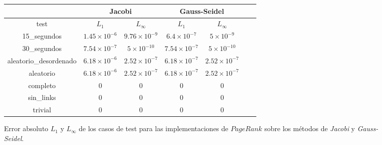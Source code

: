 \vspace{1em}
\begin{figure}[!htbp]
        \begin{tabular}{ |c|c|c|c|c|c|c| } 
        \hline
                                & \multicolumn{2}{c|}{Jacobi}    & \multicolumn{2}{c|}{Gauss-Seidel} \\
        \hline
        test                    & $L_1$             & $L_{\infty}$      & $L_1$     & $L_{\infty}$ \\
        \hline
        15\_segundos            & $1.45 \times 10^{-6}$  & $9.76 \times 10^{-9}$  & $6.4 \times 10^{-7}$  & $5 \times 10^{-9}$ \\
        30\_segundos            & $7.54 \times 10^{-7}$  & $5 \times 10^{-10}$  & $7.54 \times 10^{-7}$  & $5 \times 10^{-10}$ \\
        aleatorio\_desordenado   & $6.18 \times 10^{-6}$  & $2.52 \times 10^{-7}$  & $6.18 \times 10^{-7}$  & $2.52 \times 10^{-7}$ \\
        aleatorio               & $6.18 \times 10^{-6}$  & $2.52 \times 10^{-7}$  & $6.18 \times 10^{-7}$  & $2.52 \times 10^{-7}$ \\
        completo                & $0$  & $0$  & $0$  & $0$ \\
        sin\_links              & $0$  & $0$  & $0$  & $0$ \\
        trivial                 & $0$  & $0$  & $0$  & $0$ \\
        \hline                  
        \end{tabular}       
    \bigskip
    \caption{Error absoluto $L_1$ y $L_{\infty}$ de los casos de test para las implementaciones de $PageRank$ sobre los métodos de \textit{Jacobi} y \textit{Gauss-Seidel}.} \label{convergencia_resultados}
\end{figure}
